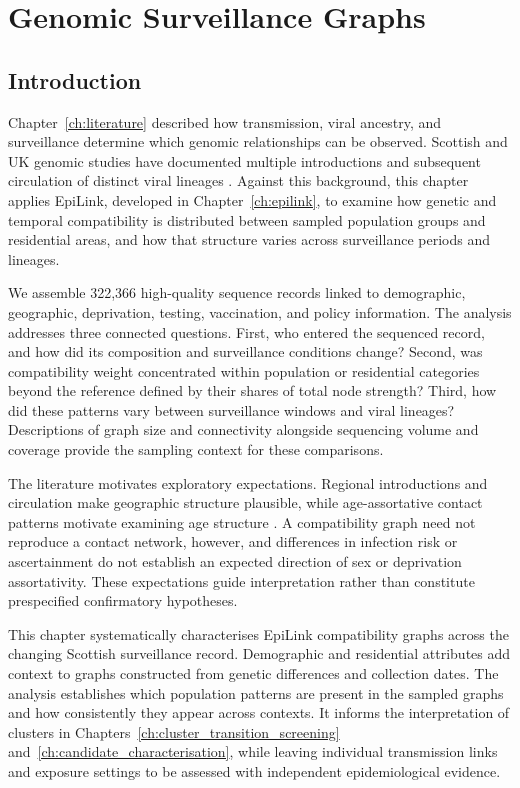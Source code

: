\chapter{Genomic Surveillance Graphs}\label{ch:genomic_networks}

\section{Introduction}\label{sec:ch4_introduction}

Chapter~\ref{ch:literature} described how transmission, viral ancestry, and surveillance determine which genomic relationships can be observed. Scottish and UK genomic studies have documented multiple introductions and subsequent circulation of distinct viral lineages \citep{daSilvaFilipe2020,duPlessis2021,Vohringer2021}. Against this background, this chapter applies EpiLink, developed in Chapter~\ref{ch:epilink}, to examine how genetic and temporal compatibility is distributed between sampled population groups and residential areas, and how that structure varies across surveillance periods and lineages.

We assemble 322,366 high-quality sequence records linked to demographic, geographic, deprivation, testing, vaccination, and policy information. The analysis addresses three connected questions. First, who entered the sequenced record, and how did its composition and surveillance conditions change? Second, was compatibility weight concentrated within population or residential categories beyond the reference defined by their shares of total node strength? Third, how did these patterns vary between surveillance windows and viral lineages? Descriptions of graph size and connectivity alongside sequencing volume and coverage provide the sampling context for these comparisons.

The literature motivates exploratory expectations. Regional introductions and circulation make geographic structure plausible, while age-assortative contact patterns motivate examining age structure \citep{daSilvaFilipe2020,duPlessis2021,Mossong2008}. A compatibility graph need not reproduce a contact network, however, and differences in infection risk or ascertainment do not establish an expected direction of sex or deprivation assortativity. These expectations guide interpretation rather than constitute prespecified confirmatory hypotheses.

This chapter systematically characterises EpiLink compatibility graphs across the changing Scottish surveillance record. Demographic and residential attributes add context to graphs constructed from genetic differences and collection dates. The analysis establishes which population patterns are present in the sampled graphs and how consistently they appear across contexts. It informs the interpretation of clusters in Chapters~\ref{ch:cluster_transition_screening} and~\ref{ch:candidate_characterisation}, while leaving individual transmission links and exposure settings to be assessed with independent epidemiological evidence.

